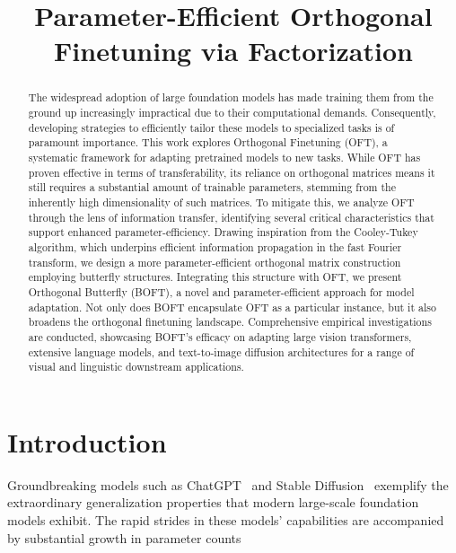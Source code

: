 \title{Parameter-Efficient Orthogonal Finetuning via Factorization}

\begin{abstract}
The widespread adoption of large foundation models has made training them from the ground up increasingly impractical due to their computational demands. Consequently, developing strategies to efficiently tailor these models to specialized tasks is of paramount importance. This work explores Orthogonal Finetuning (OFT), a systematic framework for adapting pretrained models to new tasks. While OFT has proven effective in terms of transferability, its reliance on orthogonal matrices means it still requires a substantial amount of trainable parameters, stemming from the inherently high dimensionality of such matrices. To mitigate this, we analyze OFT through the lens of information transfer, identifying several critical characteristics that support enhanced parameter-efficiency. Drawing inspiration from the Cooley-Tukey algorithm, which underpins efficient information propagation in the fast Fourier transform, we design a more parameter-efficient orthogonal matrix construction employing butterfly structures. Integrating this structure with OFT, we present Orthogonal Butterfly (BOFT), a novel and parameter-efficient approach for model adaptation. Not only does BOFT encapsulate OFT as a particular instance, but it also broadens the orthogonal finetuning landscape. Comprehensive empirical investigations are conducted, showcasing BOFT’s efficacy on adapting large vision transformers, extensive language models, and text-to-image diffusion architectures for a range of visual and linguistic downstream applications.
\end{abstract}

\section{Introduction}

Groundbreaking models such as ChatGPT~\cite{brown2020language,chen2021evaluating} and Stable Diffusion~\cite{rombach2022high} exemplify the extraordinary generalization properties that modern large-scale foundation models exhibit. The rapid strides in these models’ capabilities are accompanied by substantial growth in parameter counts

